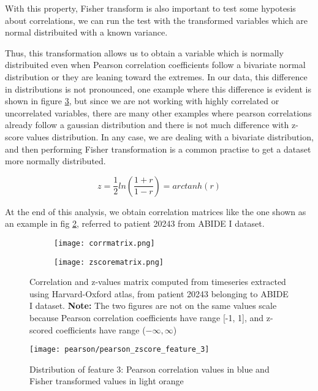 \documentclass[10pt]{report}
\begin{document}
With this property, Fisher transform is also important to test some hypotesis about correlations, we can run the test with the transformed variables which are normal distribuited with a known variance.

Thus, this transformation allows us to obtain a variable which is normally distribuited even when Pearson correlation coefficients follow a bivariate normal distribution or they are leaning toward the extremes.
In our data, this difference in distributions is not pronounced, one example where this difference is evident is shown in figure \ref{fig:pearson_zscore_distribution_3}, but since we are not working with highly correlated or uncorrelated variables, there are many other examples where pearson correlations already follow a gaussian distribution and there is not much difference with z-score values distribution.
In any case, we are dealing with a bivariate distribution, and then performing Fisher transformation is a common practise to get a dataset more normally distributed.

\begin{equation}
z = \frac{1}{2}ln\left(\frac{1+r}{1-r}\right) = arctanh(r)
\end{equation}

At the end of this analysis, we obtain correlation matrices like the one shown as an example in fig \ref{fig:corrmatrices}, referred to patient 20243 from ABIDE I dataset.
\begin{figure}
\begin{subfigure}{0.5\textwidth}
\texttt{[image: corrmatrix.png]}
\caption{}
\label{ref:corrmatrix}
\end{subfigure}
\begin{subfigure}{0.5\textwidth}
\texttt{[image: zscorematrix.png]}
\end{subfigure}
\caption{Correlation and z-values matrix computed from timeseries extracted using Harvard-Oxford atlas, from patient 20243 belonging to ABIDE I dataset. \textbf{Note:} The two figures are not on the same values scale because Pearson correlation coefficients have range [-1, 1], and z-scored coefficients have range ($-\infty,\infty$)}
\label{fig:corrmatrices}
\end{figure}


\begin{figure}[h!]
\centering
\texttt{[image: pearson/pearson\_zscore\_feature\_3]}
\caption{Distribution of feature 3: Pearson correlation values in blue and Fisher transformed values in light orange}
\label{fig:pearson_zscore_distribution_3}
\end{figure}
\end{document}
